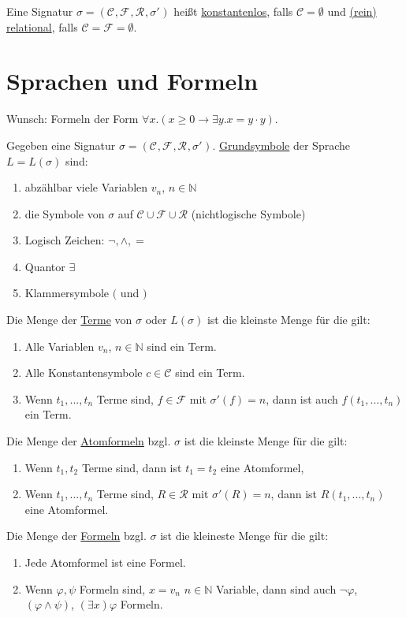 \documentclass{article}
\theoremstyle{definition}
\theoremstyle{plain}
\newcommand{\calC}{\mathcal{C}}
\newcommand{\calF}{\mathcal{F}}
\newcommand{\calR}{\mathcal{R}}
\newcommand{\sign}[1]{(\calC_{#1}, \calF_{#1}, \calR_{#1}, \sigma'_{#1})}
\begin{document}
    Eine Signatur $ \sigma = \sign{} $ heißt \underline{konstantenlos}, falls $ \calC = \emptyset $ und \underline{(rein) relational}, falls $ \calC = \calF = \emptyset $.

    \section{Sprachen und Formeln}

    Wunsch: Formeln der Form $ \forall x. (x \geq 0 \rightarrow \exists y. x = y \cdot y) $.

    Gegeben eine Signatur $ \sigma = \sign{} $.
    \underline{Grundsymbole} der Sprache $ L = L(\sigma) $ sind:
    \begin{enumerate}
        \item abzählbar viele Variablen $ v_n $, $ n \in \mathbb{N} $
        \item die Symbole von $ \sigma $ auf $ \calC \cup \calF \cup \calR $ (nichtlogische Symbole)
        \item Logisch Zeichen: $ \neg, \land, = $
        \item Quantor $ \exists $
        \item Klammersymbole $ ( $ und $ ) $
    \end{enumerate}

    Die Menge der \underline{Terme} von $ \sigma $ oder $ L(\sigma) $ ist die kleinste Menge für die gilt:
    \begin{enumerate}
        \item Alle Variablen $ v_n $, $ n \in \mathbb{N} $ sind ein Term.
        \item Alle Konstantensymbole $ c \in \calC $ sind ein Term.
        \item Wenn $ t_1, ..., t_n $ Terme sind, $ f \in \calF $ mit $ \sigma'(f) = n $, dann ist auch $ f(t_1, ..., t_n) $ ein Term.
    \end{enumerate}

    Die Menge der \underline{Atomformeln} bzgl. $ \sigma $ ist die kleinste Menge für die gilt:
    \begin{enumerate}
        \item Wenn $ t_1, t_2 $ Terme sind, dann ist $ t_1 = t_2 $ eine Atomformel,
        \item Wenn $ t_1, ..., t_n $ Terme sind, $ R \in \calR $ mit $ \sigma'(R) = n $, dann ist $ R(t_1, ..., t_n) $ eine Atomformel.
    \end{enumerate}

    Die Menge der \underline{Formeln} bzgl. $\sigma $ ist die kleineste Menge für die gilt:
    \begin{enumerate}
        \item Jede Atomformel ist eine Formel.
        \item Wenn $ \varphi, \psi $ Formeln sind, $ x = v_n $ $ n \in \mathbb{N} $ Variable, dann sind auch $ \neg \varphi$, $ (\varphi \land \psi) $, $ (\exists x) \varphi $ Formeln.
    \end{enumerate}
\end{document}
